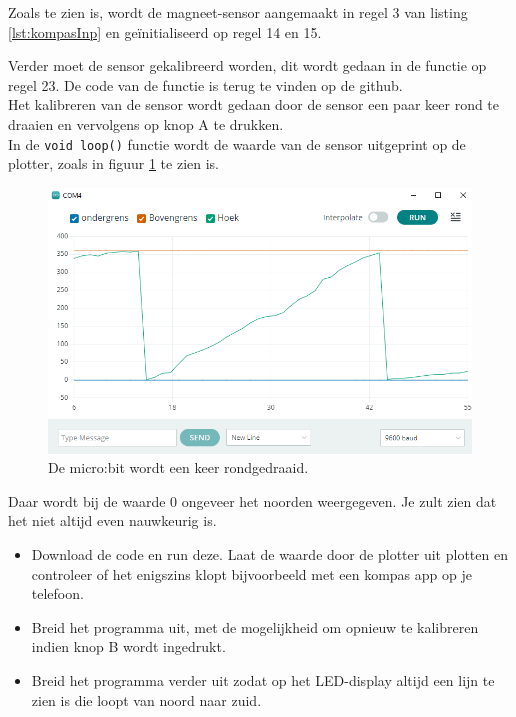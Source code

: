 \begin{enumerate}
Zoals te zien is, wordt de magneet-sensor aangemaakt in regel 3 van listing \ref{lst:kompasInp} en geïnitialiseerd op regel 14 en 15.

Verder moet de sensor gekalibreerd worden, dit wordt gedaan in de functie op regel 23. De code van de functie is terug te vinden op de github.\\

Het kalibreren van de sensor wordt gedaan door de sensor een paar keer rond te draaien en vervolgens op knop A te drukken.\\

In de  \lstinline|void loop()| functie wordt de waarde van de sensor uitgeprint op de plotter, zoals in figuur \ref{fig:kompas_circle} te zien is.
\begin{figure}[h!]
	\captionsetup{justification=centering}
	\includegraphics[width=0.5 \linewidth]{figuren/kompas_circle}
	\centering
	\caption{De micro:bit wordt een keer rondgedraaid.}
	\label{fig:kompas_circle}
\end{figure}
Daar wordt bij de waarde 0 ongeveer het noorden weergegeven. Je zult zien dat het niet altijd even nauwkeurig is.

\begin{itemize}
	\item Download de code en run deze. Laat de waarde door de plotter uit plotten en controleer of het enigszins klopt bijvoorbeeld met een kompas app op je telefoon.
	\item Breid het programma uit, met de mogelijkheid om opnieuw te kalibreren indien knop B wordt ingedrukt.
	\item Breid het programma verder uit zodat op het LED-display altijd een lijn te zien is die loopt van noord naar zuid.
\end{itemize}

\end{enumerate}
	

	
	
